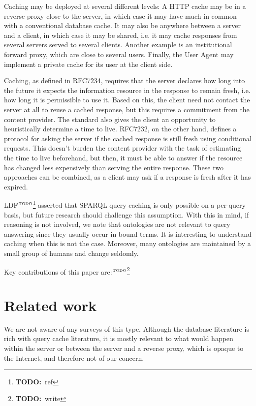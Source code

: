 \documentclass{article}
\newcommand{\todo}[1]{\ensuremath{^{\textrm{\tiny{TODO}\normalsize}}}\footnote{\textbf{TODO:}~#1}}
\begin{document}
Caching may be deployed at several different levels: A HTTP cache may
be in a reverse proxy close to the server, in which case it may have
much in common with a conventional database cache. It may also be
anywhere between a server and a client, in which case it may be
shared, i.e. it may cache responses from several servers served to
several clients. Another example is an institutional forward proxy,
which are close to several users. Finally, the User Agent may
implement a private cache for its user at the client side.

Caching, as defined in RFC7234, requires that the server declares how
long into the future it expects the information resource in the
response to remain fresh, i.e. how long it is permissible to use
it. Based on this, the client need not contact the server at all to
reuse a cached response, but this requires a commitment from the
content provider. The standard also gives the client an opportunity to
heuristically determine a time to live. RFC7232, on the other hand,
defines a protocol for asking the server if the cached response is
still fresh using conditional requests. This doesn't burden the
content provider with the task of estimating the time to live
beforehand, but then, it must be able to answer if the resource has
changed less expensively than serving the entire response. These two
approaches can be combined, as a client may ask if a response is fresh
after it has expired.

LDF\todo{ref} asserted that SPARQL query caching is only possible on a
per-query basis, but future research should challenge this
assumption. With this in mind, if reasoning is not involved, we note
that ontologies are not relevant to query answering since they usually
occur in bound terms. It is interesting to understand caching when
this is not the case. Moreover, many ontologies are maintained by a
small group of humans and change seldomly.

Key contributions of this paper are:\todo{write}

\section{Related work}

We are not aware of any surveys of this type. Although the database
literature is rich with query cache literature, it is mostly relevant
to what would happen within the server or between the server and a
reverse proxy, which is opaque to the Internet, and therefore not of
our concern.
\end{document}
